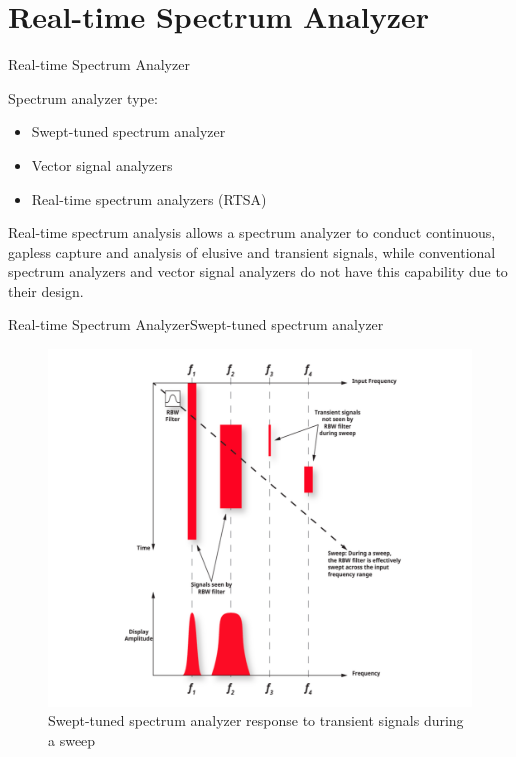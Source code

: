 \section{Real-time Spectrum Analyzer}
\begin{frame}{Real-time Spectrum Analyzer}{}
	\begin{block}{Spectrum analyzer type:}
		\begin{itemize}
			\item Swept-tuned spectrum analyzer
			\item Vector signal analyzers
			\item Real-time spectrum analyzers (RTSA)
		\end{itemize}
	\end{block}
	\pause
	\begin{block}{}
		Real-time spectrum analysis allows a spectrum analyzer to conduct continuous,
		gapless capture and analysis of elusive and transient signals, while conventional
		spectrum analyzers and vector signal analyzers do not have this capability due to their design.
	\end{block}
\end{frame}
\begin{frame}{Real-time Spectrum Analyzer}{Swept-tuned spectrum analyzer}
	\begin{figure}
		\centering
		\includegraphics[scale=0.65]{graphics/rtsa_fig1_2.png}
		\caption{Swept-tuned spectrum analyzer response to transient signals during a sweep}
	\end{figure}
\end{frame}
